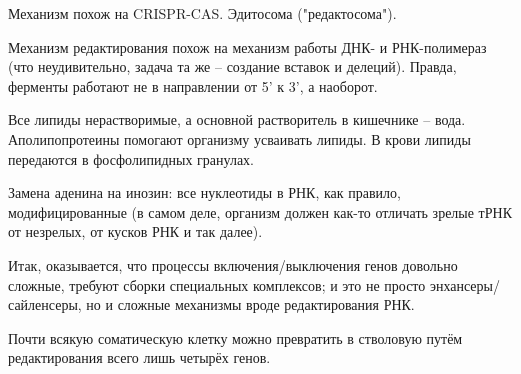 \documentclass[main.tex]{subfiles}
\begin{document}
Механизм похож на CRISPR-CAS.
Эдитосома ("редактосома").

Механизм редактирования похож на механизм работы ДНК- и РНК-полимераз (что неудивительно, задача та же -- создание вставок и делеций). Правда, ферменты работают не в направлении от 5' к 3', а наоборот.

Все липиды нерастворимые, а основной растворитель в кишечнике -- вода.
Аполипопротеины помогают организму усваивать липиды.
В крови липиды передаются в фосфолипидных гранулах.

Замена аденина на инозин:
все нуклеотиды в РНК, как правило, модифицированные (в самом деле, организм должен как-то отличать зрелые тРНК от незрелых, от кусков РНК и так далее).

Итак, оказывается, что процессы включения/выключения генов довольно сложные, требуют сборки специальных комплексов; и это не просто энхансеры/сайленсеры, но и сложные механизмы вроде редактирования РНК.

\begin{leftbar}
	Почти всякую соматическую клетку можно превратить в стволовую путём редактирования всего лишь четырёх генов.
\end{leftbar}
\end{document}
